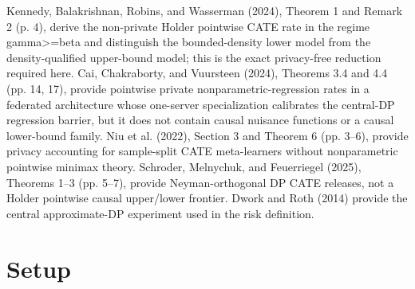 \documentclass{article}
\begin{document}
Kennedy, Balakrishnan, Robins, and Wasserman (2024), Theorem 1 and Remark 2 (p. 4), derive the non-private Holder pointwise CATE rate in the regime gamma>=beta and distinguish the bounded-density lower model from the density-qualified upper-bound model; this is the exact privacy-free reduction required here. Cai, Chakraborty, and Vuursteen (2024), Theorems 3.4 and 4.4 (pp. 14, 17), provide pointwise private nonparametric-regression rates in a federated architecture whose one-server specialization calibrates the central-DP regression barrier, but it does not contain causal nuisance functions or a causal lower-bound family. Niu et al. (2022), Section 3 and Theorem 6 (pp. 3--6), provide privacy accounting for sample-split CATE meta-learners without nonparametric pointwise minimax theory. Schroder, Melnychuk, and Feuerriegel (2025), Theorems 1--3 (pp. 5--7), provide Neyman-orthogonal DP CATE releases, not a Holder pointwise causal upper/lower frontier. Dwork and Roth (2014) provide the central approximate-DP experiment used in the risk definition.

\section{Setup}
\end{document}
